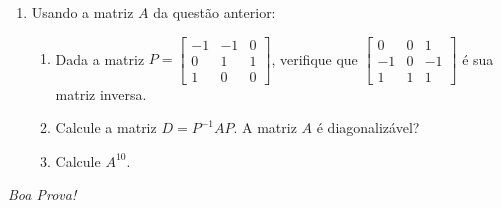 \documentclass[a4paper,5pt]{amsbook}
\begin{document}
\begin{enumerate}
	\vspace{0.5cm}
	\item Usando a matriz $A$ da quest\~ao anterior:
		\begin{enumerate}
			\vspace{0.3cm}
			\item Dada a matriz
				$P=\left[\begin{array}{ccc}
						-1 & -1 & 0 \\
						0 & 1 & 1 \\
						1 & 0 & 0
					\end{array}\right]$,
						verifique que
				$\left[\begin{array}{ccc}
						0 & 0 & 1 \\
						-1 & 0 & -1 \\
						1 & 1 & 1
					\end{array}\right]$
				\'e sua matriz inversa.
			\vspace{0.2cm}
			\item Calcule a matriz $D = P^{-1}AP$. A matriz $A$ \'e diagonaliz\'avel?
			\vspace{0.5cm}
			\item Calcule $A^{10}$.
		\end{enumerate}
\end{enumerate}

\begin{flushright}
	\vspace{1cm}
	\textit{Boa Prova!}
\end{flushright}
\end{document}
